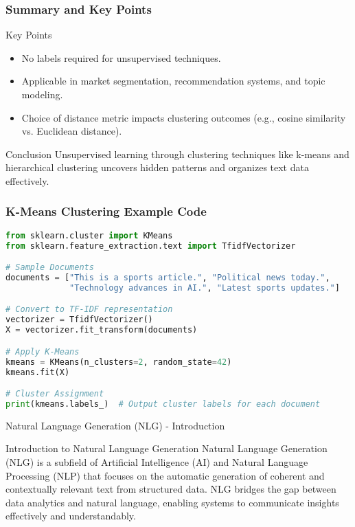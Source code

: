 \documentclass[aspectratio=169]{beamer}
\begin{document}
\begin{frame}[fragile]
    \frametitle{Summary and Key Points}
    \begin{block}{Key Points}
        \begin{itemize}
            \item No labels required for unsupervised techniques.
            \item Applicable in market segmentation, recommendation systems, and topic modeling.
            \item Choice of distance metric impacts clustering outcomes (e.g., cosine similarity vs. Euclidean distance).
        \end{itemize}
    \end{block}
    
    \begin{block}{Conclusion}
        Unsupervised learning through clustering techniques like k-means and hierarchical clustering uncovers hidden patterns and organizes text data effectively.
    \end{block}
\end{frame}

\begin{frame}[fragile]
    \frametitle{K-Means Clustering Example Code}
    \begin{lstlisting}[language=python]
from sklearn.cluster import KMeans
from sklearn.feature_extraction.text import TfidfVectorizer

# Sample Documents
documents = ["This is a sports article.", "Political news today.", 
             "Technology advances in AI.", "Latest sports updates."]

# Convert to TF-IDF representation
vectorizer = TfidfVectorizer()
X = vectorizer.fit_transform(documents)

# Apply K-Means
kmeans = KMeans(n_clusters=2, random_state=42)
kmeans.fit(X)

# Cluster Assignment
print(kmeans.labels_)  # Output cluster labels for each document
    \end{lstlisting}
\end{frame}

\begin{frame}[fragile]{Natural Language Generation (NLG) - Introduction}
    \begin{block}{Introduction to Natural Language Generation}
        Natural Language Generation (NLG) is a subfield of Artificial Intelligence (AI) and Natural Language Processing (NLP) that focuses on the automatic generation of coherent and contextually relevant text from structured data. NLG bridges the gap between data analytics and natural language, enabling systems to communicate insights effectively and understandably.
    \end{block}
\end{frame}
\end{document}
